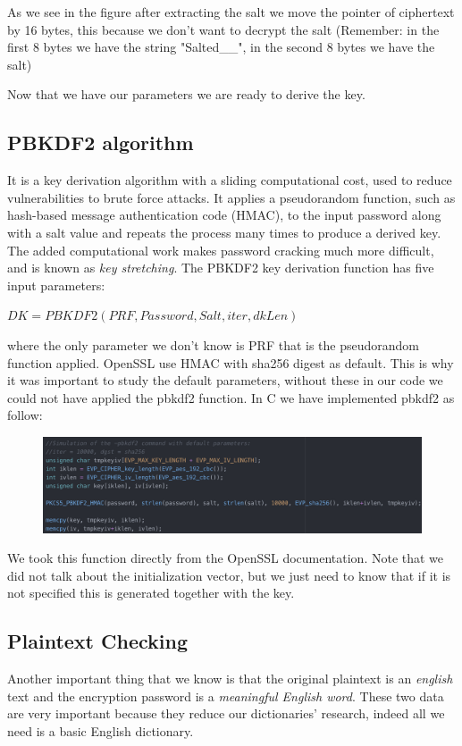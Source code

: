 \documentclass[11pt]{article}
\begin{document}
As we see in the figure after extracting the salt we move the pointer of ciphertext by 16 bytes, this because we don't want to decrypt the salt (Remember: in the first 8 bytes we have the string "Salted\_\_", in the second 8 bytes we have the salt)

Now that we have our parameters we are ready to derive the key.

\subsection{PBKDF2 algorithm}
It is a key derivation algorithm with a sliding computational cost, used to reduce vulnerabilities to brute force attacks. It applies a pseudorandom function, such as hash-based message authentication code (HMAC), to the input password along with a salt value and repeats the process many times to produce a derived key. The added computational work makes password cracking much more difficult, and is known as {\em key stretching}.
The PBKDF2 key derivation function has five input parameters:

\bigskip
$ DK = PBKDF2(PRF, Password, Salt, iter, dkLen) $
\bigskip

where the only parameter we don't know is PRF that is the pseudorandom function applied. OpenSSL use HMAC with sha256 digest as default. This is why it was important to study the default parameters, without these in our code we could not have applied the pbkdf2 function. In C we have implemented pbkdf2 as follow:

\begin{figure}[!ht]
 \includegraphics[width=1\textwidth]{pic2-hw2-1635747}
 \label{fig:pbkdf2 implementation}
\end{figure}
\newpage

We took this function directly from the OpenSSL documentation. Note that we did not talk about the initialization vector, but we just need to know that if it is not specified this is generated together with the key.

\subsection{Plaintext Checking}
Another important thing that we know is that the original plaintext is an {\em english} text and the encryption password is a {\em meaningful English word}. These two data are very important because they reduce our dictionaries' research, indeed all we need is a basic English dictionary.
\end{document}
